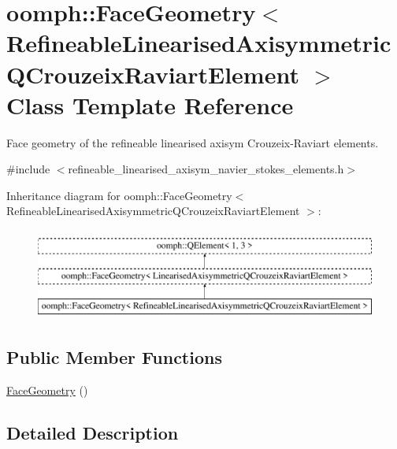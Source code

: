 \hypertarget{classoomph_1_1FaceGeometry_3_01RefineableLinearisedAxisymmetricQCrouzeixRaviartElement_01_4}{}\section{oomph\+:\+:Face\+Geometry$<$ Refineable\+Linearised\+Axisymmetric\+Q\+Crouzeix\+Raviart\+Element $>$ Class Template Reference}
\label{classoomph_1_1FaceGeometry_3_01RefineableLinearisedAxisymmetricQCrouzeixRaviartElement_01_4}


Face geometry of the refineable linearised axisym Crouzeix-\/\+Raviart elements.  




{\ttfamily \#include $<$refineable\+\_\+linearised\+\_\+axisym\+\_\+navier\+\_\+stokes\+\_\+elements.\+h$>$}

Inheritance diagram for oomph\+:\+:Face\+Geometry$<$ Refineable\+Linearised\+Axisymmetric\+Q\+Crouzeix\+Raviart\+Element $>$\+:\begin{figure}[H]
\begin{center}
\leavevmode
\includegraphics[height=3.000000cm]{classoomph_1_1FaceGeometry_3_01RefineableLinearisedAxisymmetricQCrouzeixRaviartElement_01_4}
\end{center}
\end{figure}
\subsection*{Public Member Functions}
\begin{DoxyCompactItemize}
\item 
\hyperlink{classoomph_1_1FaceGeometry_3_01RefineableLinearisedAxisymmetricQCrouzeixRaviartElement_01_4_a9caa77c563f6fe8d7db893cf14abc182}{Face\+Geometry} ()
\end{DoxyCompactItemize}


\subsection{Detailed Description}
